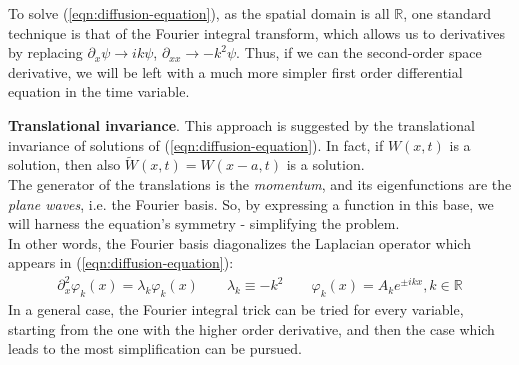 \documentclass[../template.tex]{subfiles}
\begin{document}
To solve (\ref{eqn:diffusion-equation}), as the spatial domain is all $\mathbb{R}$, one standard technique is that of the Fourier integral transform, which allows us to  derivatives by replacing $\partial_x \psi \to ik\psi$, $\partial_{xx} \to -k^2 \psi$. Thus, if we can  the second-order space derivative, we will be left with a much more simpler first order differential equation in the time variable.

\begin{expl}
    \textbf{Translational invariance}. This approach is suggested by the translational invariance of solutions of (\ref{eqn:diffusion-equation}). In fact, if $W(x,t)$ is a solution, then also $\tilde{W}(x,t) = W(x-a,t)$ is a solution.\\
    The generator of the translations is the \textit{momentum}, and its eigenfunctions are the \textit{plane waves}, i.e. the Fourier basis. So, by expressing a function in this base, we will harness the equation's symmetry - simplifying the problem.\\
    In other words, the Fourier basis diagonalizes the Laplacian operator which appears in (\ref{eqn:diffusion-equation}):
    \begin{align*}
        \partial_x^2 \varphi_k(x) = \lambda_k \varphi_k(x) \qquad \lambda_k \equiv -k^2 \qquad \varphi_k(x) = A_k e^{\pm i k x}, k \in \mathbb{R}
    \end{align*}
    In a general case, the Fourier integral trick can be tried for every variable, starting from the one with the higher order derivative, and then the case which leads to the most simplification can be pursued.
\end{expl}
\end{document}
